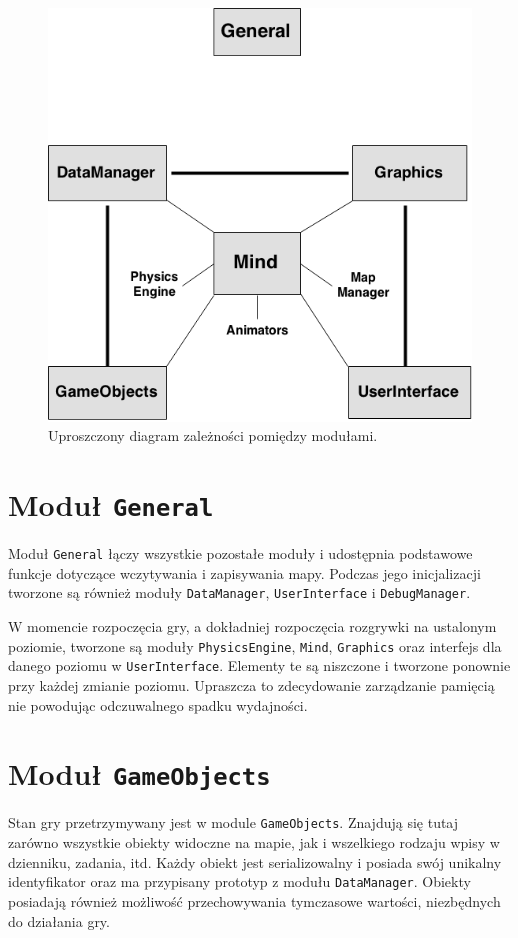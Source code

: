 \documentclass[licencjacka]{pracamgr}
\begin{document}
    \begin{figure}[htbp]
      \centering
      \includegraphics[scale=0.5]{diagram-klas.png}
      \caption{Uproszczony diagram zależności pomiędzy modułami.}
    \end{figure}

  \section{Moduł \texttt{General}}
    Moduł \texttt{General} łączy wszystkie pozostałe moduły i udostępnia podstawowe funkcje dotyczące wczytywania i zapisywania
    mapy. Podczas jego inicjalizacji tworzone są również moduły \texttt{DataManager}, \texttt{UserInterface} i
    \texttt{DebugManager}.

    W momencie rozpoczęcia gry, a dokładniej rozpoczęcia rozgrywki na ustalonym poziomie, tworzone są moduły \texttt{PhysicsEngine},
    \texttt{Mind}, \texttt{Graphics} oraz interfejs dla danego poziomu w \texttt{UserInterface}. Elementy te są niszczone i tworzone
    ponownie przy każdej zmianie poziomu. Upraszcza to zdecydowanie zarządzanie pamięcią nie powodując odczuwalnego spadku wydajności.

  \section{Moduł \texttt{GameObjects}}
    Stan gry przetrzymywany jest w module \texttt{GameObjects}. Znajdują się tutaj zarówno wszystkie obiekty widoczne na
    mapie, jak i wszelkiego rodzaju wpisy w dzienniku, zadania, itd. Każdy obiekt jest serializowalny i posiada swój unikalny
    identyfikator oraz ma przypisany prototyp z modułu \texttt{DataManager}. Obiekty posiadają również możliwość przechowywania
    tymczasowe wartości, niezbędnych do działania gry.
\end{document}

